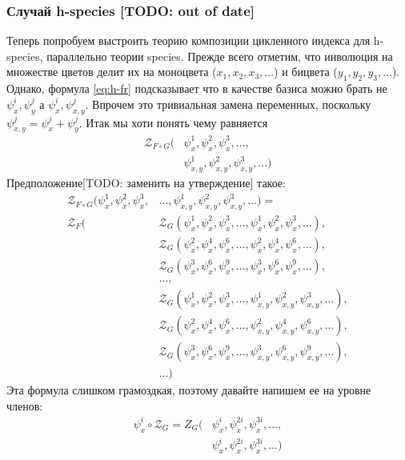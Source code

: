 \subsubsection{Случай h-species [TODO: out of date]}
Теперь попробуем выстроить теорию композиции цикленного индекса для h-species,
параллельно теории species. Прежде всего отметим, что инволюция на множестве
цветов делит их на моноцвета ($x_1, x_2, x_3, \dots$) и бицвета ($y_1, y_2,
y_3, \dots$). Однако, формула \ref{eq:h-fr} подсказывает что в качестве базиса
можно брать не $\psi_x^i, \psi_y^j$ а $\psi_x^i, \psi_{x,y}^j$. Впрочем это
тривиальная замена переменных, поскольку $\psi_{x,y}^j = \psi_x^j + \psi_y^j$.
Итак мы хоти понять чему равняется
\begin{equation*}
\begin{split}
\mathcal Z_{F \circ G} (&\psi_x^1, \psi_x^2, \psi_x^3, \dots, \\
						&\psi_{x,y}^1, \psi_{x,y}^2, \psi_{x,y}^3, \dots)
\end{split}
\end{equation*}
Предположение[TODO: заменить на утверждение] такое:
\begin{equation}
\begin{split}
\label{eq:h-zfg}
	\mathcal Z_{F \circ G} (\psi_x^1, \psi_x^2, \psi_x^3, &\dots, 
	\psi_{x,y}^1, \psi_{x,y}^2, \psi_{x,y}^3, \dots) = \\
	\mathcal Z_F(
		&\mathcal Z_G(\psi_x^1, \psi_x^2, \psi_x^3, \dots, 
					 \psi_x^1, \psi_x^2, \psi_x^3, \dots), \\
		&\mathcal Z_G(\psi_x^2, \psi_x^4, \psi_x^6, \dots, 
					 \psi_x^2, \psi_x^4, \psi_x^6, \dots), \\
		&\mathcal Z_G(\psi_x^3, \psi_x^6, \psi_x^9, \dots, 
					 \psi_x^3, \psi_x^6, \psi_x^9, \dots), \\
		&\dots, \\
		&\mathcal Z_G(\psi_x^1, \psi_x^2, \psi_x^3, \dots, 
					 \psi_{x,y}^1, \psi_{x,y}^2, \psi_{x,y}^3, \dots), \\
		&\mathcal Z_G(\psi_x^2, \psi_x^4, \psi_x^6, \dots, 
					 \psi_{x,y}^2, \psi_{x,y}^4, \psi_{x,y}^6, \dots), \\
		&\mathcal Z_G(\psi_x^3, \psi_x^6, \psi_x^9, \dots, 
					 \psi_{x,y}^3, \psi_{x,y}^6, \psi_{x,y}^9, \dots), \\
		&\dots
	)
\end{split}	
\end{equation}
Эта формула слишком грамоздкая, поэтому давайте напишем ее на уровне членов:
\begin{equation*}
\begin{split}
\psi_x^i \circ \mathcal Z_G = Z_G(&\psi_x^i, \psi_x^{2i}, \psi_x^{3i}, \dots, \\ 
					 			  &\psi_x^i, \psi_x^{2i}, \psi_x^{3i}, \dots)
\end{split}
\end{equation*}
